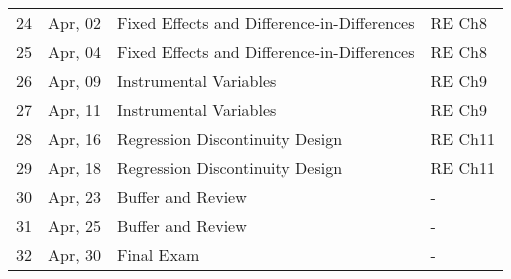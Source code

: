\begin{table}[ht]
\begin{tabular}{rlll}
  24 & Apr, 02 & Fixed Effects and Difference-in-Differences & RE Ch8 \\ 
  25 & Apr, 04 & Fixed Effects and Difference-in-Differences & RE Ch8 \\ 
  26 & Apr, 09 & Instrumental Variables & RE Ch9 \\ 
  27 & Apr, 11 & Instrumental Variables & RE Ch9 \\ 
  28 & Apr, 16 & Regression Discontinuity Design & RE Ch11 \\ 
  29 & Apr, 18 & Regression Discontinuity Design & RE Ch11 \\ 
  30 & Apr, 23 & Buffer and Review & - \\ 
  31 & Apr, 25 & Buffer and Review & - \\ 
  32 & Apr, 30 & Final Exam & - \\ 
   \hline
\end{tabular}
\end{table}
